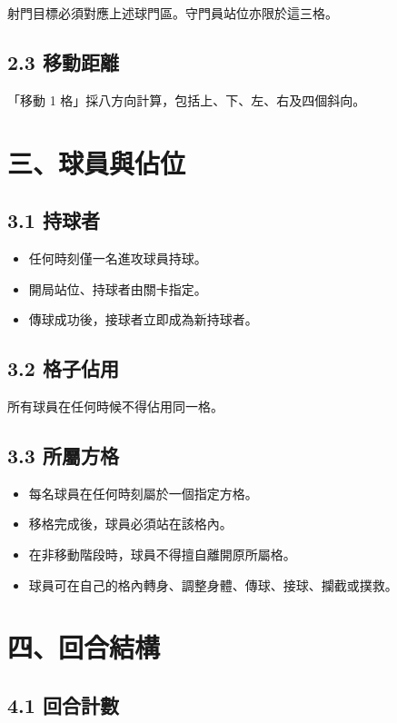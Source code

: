 \documentclass[11pt]{article}
\begin{document}
射門目標必須對應上述球門區。守門員站位亦限於這三格。

\subsection*{2.3 移動距離}

「移動 1 格」採八方向計算，包括上、下、左、右及四個斜向。

\section*{三、球員與佔位}

\subsection*{3.1 持球者}

\begin{itemize}
  \item 任何時刻僅一名進攻球員持球。
  \item 開局站位、持球者由關卡指定。
  \item 傳球成功後，接球者立即成為新持球者。
\end{itemize}

\subsection*{3.2 格子佔用}

所有球員在任何時候不得佔用同一格。

\subsection*{3.3 所屬方格}

\begin{itemize}
  \item 每名球員在任何時刻屬於一個指定方格。
  \item 移格完成後，球員必須站在該格內。
  \item 在非移動階段時，球員不得擅自離開原所屬格。
  \item 球員可在自己的格內轉身、調整身體、傳球、接球、攔截或撲救。
\end{itemize}

\section*{四、回合結構}

\subsection*{4.1 回合計數}
\end{document}
